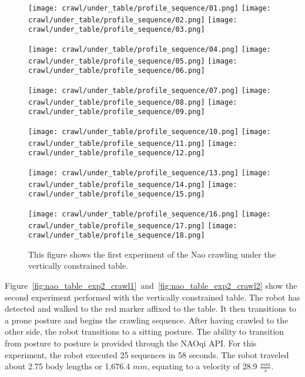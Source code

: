 \begin{figure}
  \centerline{
    \texttt{[image: crawl/under\_table/profile\_sequence/01.png]}
    \texttt{[image: crawl/under\_table/profile\_sequence/02.png]}
    \texttt{[image: crawl/under\_table/profile\_sequence/03.png]}
  }
  \vspace*{0.05in}
  \centerline{
    \texttt{[image: crawl/under\_table/profile\_sequence/04.png]}
    \texttt{[image: crawl/under\_table/profile\_sequence/05.png]}
    \texttt{[image: crawl/under\_table/profile\_sequence/06.png]}
  }
    \vspace*{0.05in}
  \centerline{
    \texttt{[image: crawl/under\_table/profile\_sequence/07.png]}
    \texttt{[image: crawl/under\_table/profile\_sequence/08.png]}
    \texttt{[image: crawl/under\_table/profile\_sequence/09.png]}
  }
    \vspace*{0.05in}
  \centerline{
    \texttt{[image: crawl/under\_table/profile\_sequence/10.png]}
    \texttt{[image: crawl/under\_table/profile\_sequence/11.png]}
    \texttt{[image: crawl/under\_table/profile\_sequence/12.png]}
  }
    \vspace*{0.05in}
  \centerline{
    \texttt{[image: crawl/under\_table/profile\_sequence/13.png]}
    \texttt{[image: crawl/under\_table/profile\_sequence/14.png]}
    \texttt{[image: crawl/under\_table/profile\_sequence/15.png]}
  }
    \vspace*{0.05in}
  \centerline{
    \texttt{[image: crawl/under\_table/profile\_sequence/16.png]}
    \texttt{[image: crawl/under\_table/profile\_sequence/17.png]}
    \texttt{[image: crawl/under\_table/profile\_sequence/18.png]}
  }
  \caption{This figure shows the first experiment of the Nao crawling under the vertically constrained table.}
  \label{fig:nao_table_exp1_crawl1}
\end{figure}

Figure~\ref{fig:nao_table_exp2_crawl1}~and~\ref{fig:nao_table_exp2_crawl2} show the second
experiment performed with the vertically constrained table. The robot has detected and walked to
the red marker affixed to the table. It then transitions to a prone posture and begins the crawling
sequence. After having crawled to the other side, the robot transitions to a sitting posture.
The ability to transition from posture to posture is provided through the NAOqi API\@.
For this experiment, the robot executed 25 sequences in 58 seconds. The robot traveled
about 2.75 body lengths or 1,676.4 $mm$, equating to a velocity of 28.9 $\frac{mm}{s}$.

